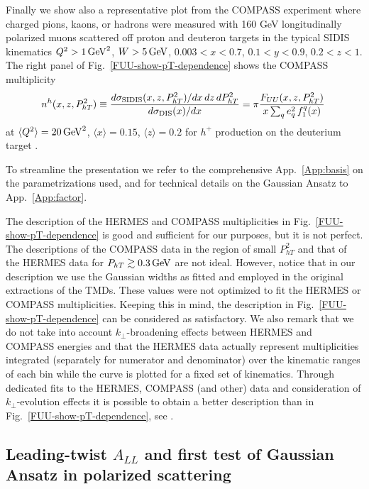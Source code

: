 \documentclass[a4paper,11pt]{article}
\newcommand{\be}{\begin{equation}}
\newcommand{\ee}{\end{equation}}
\newcommand{\la}{\langle}
\newcommand{\ra}{\rangle}
\def\Phperp{P_{hT}}
\def\kperp{k_\perp}
\begin{document}
Finally we show also a representative plot from the COMPASS experiment
where charged pions, kaons, or hadrons were measured with 160 GeV
longitudinally polarized muons scattered off proton and deuteron
targets in the typical SIDIS kinematics
$Q^2 > 1 \,{\rm GeV}^2$, $W > 5\,{\rm GeV}$,
$0.003 < x < 0.7$, $0.1<y < 0.9$, $0.2<z<1$.
The right panel of
Fig.~\ref{FUU-show-pT-dependence} shows the COMPASS multiplicity
\cite{Aghasyan:2017ctw}
\be\label{Eq:multiplicity-COMPASS}
	n^h(x,z,\Phperp^2)  \equiv
	\frac{d\sigma_{\rm SIDIS}(x,z,\Phperp^2)/dx\,dz\,d\Phperp^2}
	{d\sigma_{\rm DIS}(x)/dx} =
	\pi \frac{F_{UU}(x,z,\Phperp^2) }{ x \sum_q e_q^2\,f^q_1(x)}\;
\ee
at $\la Q^2\ra=20\,{\rm GeV}^2$, $\la x\ra  =0.15$, $\la z\ra  =0.2$
for $h^+$ production on the deuterium target \cite{Aghasyan:2017ctw}.

To streamline the presentation we refer to the comprehensive App.~\ref{App:basis}
on the parametrizations used, 
and for technical details on the Gaussian Ansatz to App.~\ref{App:factor}.

The description of the HERMES and COMPASS multiplicities in
Fig.~\ref{FUU-show-pT-dependence} is good and sufficient for our
purposes, but it is not perfect. The descriptions of the COMPASS
data in the region of small $\Phperp^2$ and that of the HERMES data
for $\Phperp \gtrsim 0.3\,{\rm GeV}$ are not ideal.
However, notice that in our description we use the Gaussian widths
as fitted and employed in the original extractions of the TMDs. These
values were not optimized to fit the HERMES or COMPASS multiplicities.
Keeping this in mind, the description in Fig.~\ref{FUU-show-pT-dependence}
can be considered as satisfactory. We also remark that we do not take
into account $\kperp$-broadening effects between HERMES and
COMPASS energies and that the HERMES data actually represent
multiplicities integrated (separately for numerator and denominator)
over the kinematic ranges of each bin while the curve is plotted for
a fixed set of kinematics. Through dedicated fits to the HERMES, COMPASS
(and other) data and consideration of $\kperp$-evolution effects
it is possible to obtain a better description than in
Fig.~\ref{FUU-show-pT-dependence}, see \cite{Bacchetta:2017gcc}.

\subsection{\boldmath Leading-twist $A_{LL}$ and first test of Gaussian Ansatz
	in polarized scattering}
\label{Sec-5.2:FLL-basis}
\end{document}

